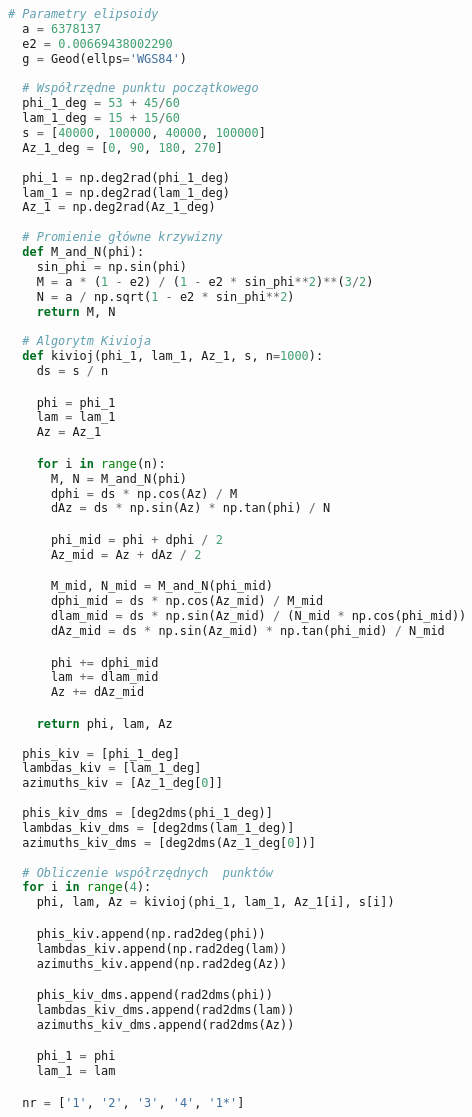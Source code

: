 \documentclass[fleqn,10pt,a4paper]{article}
\begin{document}
\begin{lstlisting}[language=Python, caption = Algorytm Kivioja, label = kod:kivioja, style = mycode]
  # Parametry elipsoidy
  a = 6378137
  e2 = 0.00669438002290
  g = Geod(ellps='WGS84')
  
  # Współrzędne punktu początkowego
  phi_1_deg = 53 + 45/60
  lam_1_deg = 15 + 15/60
  s = [40000, 100000, 40000, 100000]
  Az_1_deg = [0, 90, 180, 270]
  
  phi_1 = np.deg2rad(phi_1_deg)
  lam_1 = np.deg2rad(lam_1_deg)
  Az_1 = np.deg2rad(Az_1_deg)
  
  # Promienie główne krzywizny
  def M_and_N(phi):
    sin_phi = np.sin(phi)
    M = a * (1 - e2) / (1 - e2 * sin_phi**2)**(3/2)
    N = a / np.sqrt(1 - e2 * sin_phi**2)
    return M, N
  
  # Algorytm Kivioja
  def kivioj(phi_1, lam_1, Az_1, s, n=1000):
    ds = s / n

    phi = phi_1
    lam = lam_1
    Az = Az_1

    for i in range(n):
      M, N = M_and_N(phi)
      dphi = ds * np.cos(Az) / M
      dAz = ds * np.sin(Az) * np.tan(phi) / N

      phi_mid = phi + dphi / 2
      Az_mid = Az + dAz / 2

      M_mid, N_mid = M_and_N(phi_mid)
      dphi_mid = ds * np.cos(Az_mid) / M_mid
      dlam_mid = ds * np.sin(Az_mid) / (N_mid * np.cos(phi_mid))
      dAz_mid = ds * np.sin(Az_mid) * np.tan(phi_mid) / N_mid

      phi += dphi_mid
      lam += dlam_mid
      Az += dAz_mid

    return phi, lam, Az
  
  phis_kiv = [phi_1_deg]
  lambdas_kiv = [lam_1_deg]
  azimuths_kiv = [Az_1_deg[0]]
  
  phis_kiv_dms = [deg2dms(phi_1_deg)]
  lambdas_kiv_dms = [deg2dms(lam_1_deg)]
  azimuths_kiv_dms = [deg2dms(Az_1_deg[0])]
  
  # Obliczenie współrzędnych  punktów
  for i in range(4):
    phi, lam, Az = kivioj(phi_1, lam_1, Az_1[i], s[i])

    phis_kiv.append(np.rad2deg(phi))
    lambdas_kiv.append(np.rad2deg(lam))
    azimuths_kiv.append(np.rad2deg(Az))

    phis_kiv_dms.append(rad2dms(phi))
    lambdas_kiv_dms.append(rad2dms(lam))
    azimuths_kiv_dms.append(rad2dms(Az))

    phi_1 = phi
    lam_1 = lam

  nr = ['1', '2', '3', '4', '1*']


\end{lstlisting}
\end{document}
